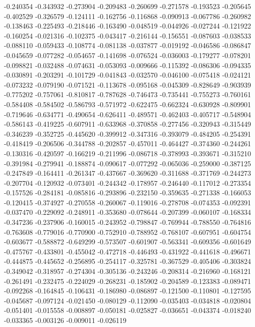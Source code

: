 -0.240354
-0.343932
-0.273904
-0.209483
-0.260699
-0.271578
-0.193523
-0.205645
-0.402529
-0.326579
-0.124111
-0.162756
-0.116868
-0.090913
-0.067786
-0.260982
-0.138463
-0.225493
-0.218446
-0.163490
-0.048519
-0.044926
-0.027244
-0.121922
-0.160254
-0.021316
-0.102375
-0.043417
-0.216144
-0.156551
-0.087603
-0.038533
-0.088110
-0.059433
-0.108774
-0.081138
-0.037877
-0.019192
-0.046586
-0.086847
-0.045659
-0.077282
-0.054657
-0.141698
-0.076524
-0.036003
-0.179277
-0.078201
-0.098821
-0.032488
-0.074631
-0.053093
-0.009666
-0.115392
-0.086306
-0.094335
-0.030891
-0.203291
-0.101729
-0.041843
-0.032570
-0.046100
-0.075418
-0.024121
-0.073232
-0.079190
-0.071521
-0.113678
-0.095168
-0.045309
-0.828649
-0.903939
-0.775202
-0.757061
-0.810817
-0.787628
-0.746473
-0.735441
-0.755273
-0.760161
-0.584408
-0.584502
-0.586793
-0.571972
-0.622475
-0.662324
-0.630928
-0.809901
-0.719646
-0.634771
-0.490654
-0.626411
-0.489571
-0.462403
-0.405717
-0.548904
-0.586143
-0.419225
-0.607911
-0.633968
-0.370858
-0.277456
-0.320943
-0.315449
-0.346239
-0.352725
-0.445620
-0.399912
-0.347316
-0.393079
-0.484205
-0.254391
-0.418419
-0.206506
-0.344788
-0.202857
-0.457011
-0.464427
-0.374360
-0.244261
-0.130316
-0.420597
-0.166219
-0.211996
-0.086718
-0.378993
-0.393671
-0.315210
-0.391984
-0.279941
-0.188874
-0.090617
-0.077292
-0.065036
-0.259000
-0.387125
-0.247849
-0.164411
-0.261347
-0.437667
-0.369620
-0.311688
-0.371769
-0.244273
-0.207704
-0.120932
-0.073401
-0.244342
-0.178957
-0.246440
-0.117012
-0.273354
-0.157526
-0.284181
-0.085816
-0.293896
-0.232150
-0.359635
-0.271338
-0.166053
-0.120415
-0.374927
-0.270558
-0.260067
-0.119016
-0.278708
-0.074353
-0.092391
-0.037470
-0.229092
-0.248911
-0.353680
-0.078644
-0.207399
-0.060107
-0.168334
-0.347236
-0.237906
-0.160015
-0.243952
-0.798847
-0.769944
-0.788550
-0.764816
-0.763608
-0.779016
-0.770900
-0.752910
-0.788952
-0.768107
-0.607951
-0.604754
-0.603677
-0.588872
-0.649299
-0.573507
-0.601907
-0.563341
-0.609356
-0.601649
-0.475767
-0.433801
-0.455042
-0.472718
-0.446493
-0.431922
-0.441618
-0.496671
-0.444875
-0.445652
-0.256895
-0.254117
-0.325781
-0.367529
-0.405406
-0.303824
-0.349042
-0.318957
-0.274304
-0.305136
-0.243246
-0.208314
-0.216960
-0.168121
-0.261491
-0.232475
-0.224029
-0.268231
-0.185902
-0.204589
-0.123383
-0.089471
-0.092268
-0.164845
-0.106431
-0.186980
-0.086897
-0.121500
-0.110801
-0.127595
-0.045687
-0.097124
-0.021450
-0.080129
-0.112090
-0.035403
-0.034818
-0.020804
-0.051401
-0.015558
-0.008897
-0.050181
-0.025827
-0.036651
-0.043374
-0.018240
-0.033365
-0.003126
-0.009011
-0.026119

